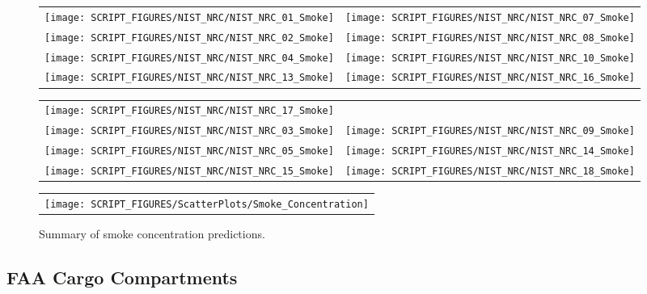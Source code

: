 \begin{figure}[p]
\begin{tabular*}{\textwidth}{l@{\extracolsep{\fill}}r}
\texttt{[image: SCRIPT\_FIGURES/NIST\_NRC/NIST\_NRC\_01\_Smoke]} &
\texttt{[image: SCRIPT\_FIGURES/NIST\_NRC/NIST\_NRC\_07\_Smoke]} \\
\texttt{[image: SCRIPT\_FIGURES/NIST\_NRC/NIST\_NRC\_02\_Smoke]} &
\texttt{[image: SCRIPT\_FIGURES/NIST\_NRC/NIST\_NRC\_08\_Smoke]} \\
\texttt{[image: SCRIPT\_FIGURES/NIST\_NRC/NIST\_NRC\_04\_Smoke]} &
\texttt{[image: SCRIPT\_FIGURES/NIST\_NRC/NIST\_NRC\_10\_Smoke]} \\
\texttt{[image: SCRIPT\_FIGURES/NIST\_NRC/NIST\_NRC\_13\_Smoke]} &
\texttt{[image: SCRIPT\_FIGURES/NIST\_NRC/NIST\_NRC\_16\_Smoke]}
\end{tabular*}
\end{figure}

\begin{figure}[p]
\begin{tabular*}{\textwidth}{l@{\extracolsep{\fill}}r}
\texttt{[image: SCRIPT\_FIGURES/NIST\_NRC/NIST\_NRC\_17\_Smoke]} &
 \\
\texttt{[image: SCRIPT\_FIGURES/NIST\_NRC/NIST\_NRC\_03\_Smoke]} &
\texttt{[image: SCRIPT\_FIGURES/NIST\_NRC/NIST\_NRC\_09\_Smoke]} \\
\texttt{[image: SCRIPT\_FIGURES/NIST\_NRC/NIST\_NRC\_05\_Smoke]} &
\texttt{[image: SCRIPT\_FIGURES/NIST\_NRC/NIST\_NRC\_14\_Smoke]} \\
\texttt{[image: SCRIPT\_FIGURES/NIST\_NRC/NIST\_NRC\_15\_Smoke]} &
\texttt{[image: SCRIPT\_FIGURES/NIST\_NRC/NIST\_NRC\_18\_Smoke]}
\end{tabular*}
\end{figure}


\begin{figure}[p]
\begin{center}
\begin{tabular}{c}
\texttt{[image: SCRIPT\_FIGURES/ScatterPlots/Smoke\_Concentration]}
\end{tabular}
\end{center}
\caption[Summary of smoke concentration predictions]{Summary of smoke concentration predictions.}
\end{figure}

\clearpage

\subsection{FAA Cargo Compartments}

